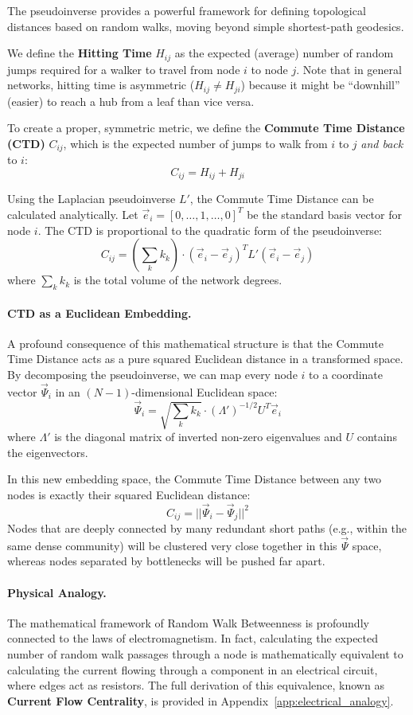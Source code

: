 The pseudoinverse provides a powerful framework for defining topological distances based on random walks, moving beyond simple shortest-path geodesics.

We define the \textbf{Hitting Time} $H_{ij}$ as the expected (average) number of random jumps required for a walker to travel from node $i$ to node $j$. Note that in general networks, hitting time is asymmetric ($H_{ij} \neq H_{ji}$) because it might be ``downhill'' (easier) to reach a hub from a leaf than vice versa.

To create a proper, symmetric metric, we define the \textbf{Commute Time Distance (CTD)} $C_{ij}$, which is the expected number of jumps to walk from $i$ to $j$ \textit{and back} to $i$:
\[
    C_{ij} = H_{ij} + H_{ji}
\]

Using the Laplacian pseudoinverse $L'$, the Commute Time Distance can be calculated analytically. Let $\vec{e}_i = [0, \dots, 1, \dots, 0]^T$ be the standard basis vector for node $i$. The CTD is proportional to the quadratic form of the pseudoinverse:
\[
    C_{ij} = \left( \sum_{k} k_k \right) \cdot (\vec{e}_i - \vec{e}_j)^T L' (\vec{e}_i - \vec{e}_j)
\]
where $\sum_k k_k$ is the total volume of the network degrees.

\paragraph{CTD as a Euclidean Embedding.}
A profound consequence of this mathematical structure is that the Commute Time Distance acts as a pure squared Euclidean distance in a transformed space. By decomposing the pseudoinverse, we can map every node $i$ to a coordinate vector $\vec{\Psi}_i$ in an $(N-1)$-dimensional Euclidean space:
\[
    \vec{\Psi}_i = \sqrt{\sum_{k} k_k} \cdot (\Lambda')^{-1/2} U^T \vec{e}_i
\]
where $\Lambda'$ is the diagonal matrix of inverted non-zero eigenvalues and $U$ contains the eigenvectors.

In this new embedding space, the Commute Time Distance between any two nodes is exactly their squared Euclidean distance:
\[
    C_{ij} = || \vec{\Psi}_i - \vec{\Psi}_j ||^2
\]
Nodes that are deeply connected by many redundant short paths (e.g., within the same dense community) will be clustered very close together in this $\vec{\Psi}$ space, whereas nodes separated by bottlenecks will be pushed far apart.

\paragraph{Physical Analogy.}
The mathematical framework of Random Walk Betweenness is profoundly connected to the laws of electromagnetism. In fact, calculating the expected number of random walk passages through a node is mathematically equivalent to calculating the current flowing through a component in an electrical circuit, where edges act as resistors. The full derivation of this equivalence, known as \textbf{Current Flow Centrality}, is provided in Appendix~\ref{app:electrical_analogy}.